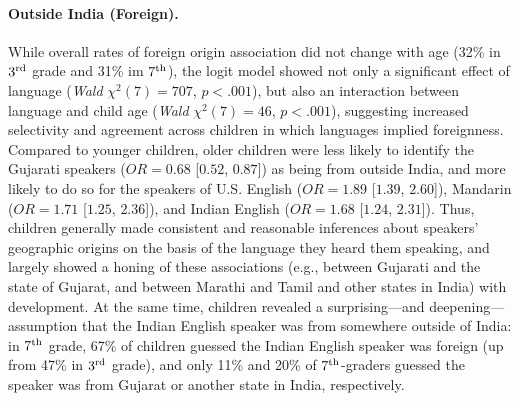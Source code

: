 \documentclass{foushee-adapted-preprint}
\begin{document}
\paragraph*{Outside India (Foreign).} 
While overall rates of foreign origin association did not change with age (32\% in $3^{\textnormal{rd}}$ grade and 31\% im $7^{\textnormal{th}}$), 
the logit model showed not only a significant effect of language (\textit{Wald} $\chi^2(7)=707$, $p<.001$), but also an interaction between language and child age (\textit{Wald} $\chi^2(7)=46$, $p<.001$), suggesting increased selectivity and agreement across children in which languages implied foreignness. Compared to younger children, older children were less likely to identify the Gujarati speakers ($OR=0.68$ [$0.52$, $0.87$]) as being from outside India, and more likely to do so for the speakers of U.S. English ($OR=1.89$ [$1.39$, $2.60$]), Mandarin ($OR=1.71$ [$1.25$, $2.36$]), and Indian English ($OR=1.68$ [$1.24$, $2.31$]). %
Thus, children generally made consistent and reasonable inferences about speakers' geographic origins on the basis of the language they heard them speaking, and largely showed a honing of these associations (e.g., between Gujarati and the state of Gujarat, and between Marathi and Tamil and other states in India) with development. At the same time, children revealed a surprising---and deepening---assumption that the Indian English speaker was from somewhere outside of India: in $7^{\textnormal{th}}$ grade, 67\% of children guessed the Indian English speaker was foreign (up from 47\% in $3^{\textnormal{rd}}$ grade), and only 11\% and 20\% of $7^{\textnormal{th}}$-graders guessed the speaker was from Gujarat or another state in India, respectively.
\end{document}
